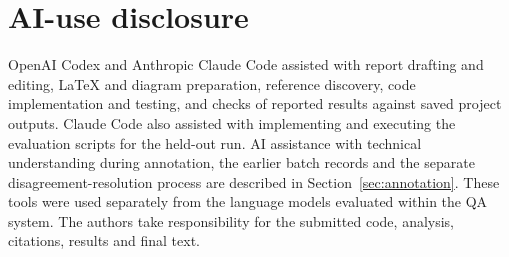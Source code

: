 \clearpage
\section{AI-use disclosure}
OpenAI Codex and Anthropic Claude Code assisted with report drafting and editing, LaTeX and diagram preparation, reference discovery, code implementation and testing, and checks of reported results against saved project outputs. Claude Code also assisted with implementing and executing the evaluation scripts for the held-out run. AI assistance with technical understanding during annotation, the earlier batch records and the separate disagreement-resolution process are described in Section~\ref{sec:annotation}. These tools were used separately from the language models evaluated within the QA system. The authors take responsibility for the submitted code, analysis, citations, results and final text.
